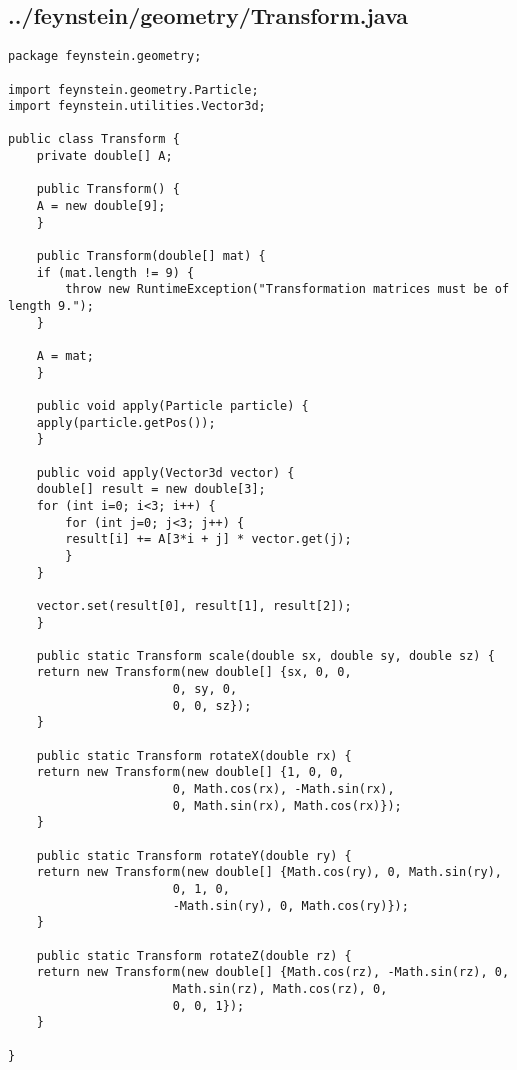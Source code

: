 \subsection*{../feynstein/geometry/Transform.java}
\begin{lstlisting}
package feynstein.geometry;

import feynstein.geometry.Particle;
import feynstein.utilities.Vector3d;

public class Transform {
    private double[] A;

    public Transform() {
	A = new double[9];
    }

    public Transform(double[] mat) {
	if (mat.length != 9) {
	    throw new RuntimeException("Transformation matrices must be of length 9.");
	}

	A = mat;
    }

    public void apply(Particle particle) {
	apply(particle.getPos());
    }

    public void apply(Vector3d vector) {
	double[] result = new double[3];
	for (int i=0; i<3; i++) {
	    for (int j=0; j<3; j++) {
		result[i] += A[3*i + j] * vector.get(j);
	    }
	}
	
	vector.set(result[0], result[1], result[2]);
    }

    public static Transform scale(double sx, double sy, double sz) {
	return new Transform(new double[] {sx, 0, 0, 
					   0, sy, 0, 
					   0, 0, sz});
    }

    public static Transform rotateX(double rx) {
	return new Transform(new double[] {1, 0, 0,
					   0, Math.cos(rx), -Math.sin(rx),
					   0, Math.sin(rx), Math.cos(rx)});
    }

    public static Transform rotateY(double ry) {
	return new Transform(new double[] {Math.cos(ry), 0, Math.sin(ry),
					   0, 1, 0,
					   -Math.sin(ry), 0, Math.cos(ry)});
    }

    public static Transform rotateZ(double rz) {
	return new Transform(new double[] {Math.cos(rz), -Math.sin(rz), 0,
					   Math.sin(rz), Math.cos(rz), 0,
					   0, 0, 1});
    }

}\end{lstlisting}

